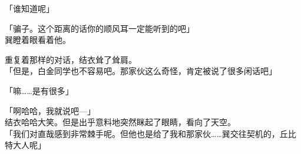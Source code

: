 「谁知道呢」

「骗子。这个距离的话你的顺风耳一定能听到的吧」\\

巽瞪着眼看着他。

重复着那样的对话，结衣耸了耸肩。\\

「但是，白金同学也不容易吧。那家伙这么奇怪，肯定被说了很多闲话吧」

「嘛……是有很多」

「啊哈哈，我就说吧—」\\

结衣哈哈大笑。但是出乎意料地突然眯起了眼睛，看向了天空。\\

「我们对直哉感到非常棘手呢。但他也是给了我和那家伙……巽交往契机的，丘比特大人呢」
